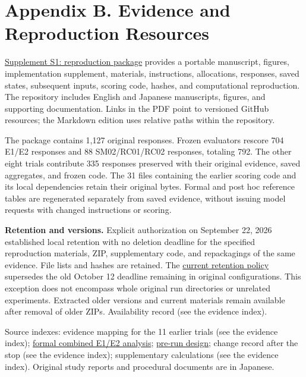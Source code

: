 \documentclass[10pt,a4paper]{article}
\begin{document}
\section{Appendix B. Evidence and Reproduction Resources}\label{paper-01-appendix-b.-evidence-and-reproduction-resources}

\href{https://github.com/metaSATOKEN/MRSI/blob/9443de315d283874df0c27e0e99b8c04f400709d/evidence/paper-01/README.md}{Supplement S1: reproduction package} provides a portable manuscript, figures, implementation supplement, materials, instructions, allocations, responses, saved states, subsequent inputs, scoring code, hashes, and computational reproduction. The repository includes English and Japanese manuscripts, figures, and supporting documentation. Links in the PDF point to versioned GitHub resources; the Markdown edition uses relative paths within the repository.

The package contains 1,127 original responses. Frozen evaluators rescore 704 E1/E2 responses and 88 SM02/RC01/RC02 responses, totaling 792. The other eight trials contribute 335 responses preserved with their original evidence, saved aggregates, and frozen code. The 31 files containing the earlier scoring code and its local dependencies retain their original bytes. Formal and post hoc reference tables are regenerated separately from saved evidence, without issuing model requests with changed instructions or scoring.

\textbf{Retention and versions.} Explicit authorization on September 22, 2026 established local retention with no deletion deadline for the specified reproduction materials, ZIP, supplementary code, and repackagings of the same evidence. File lists and hashes are retained. The \href{https://github.com/metaSATOKEN/MRSI/blob/9443de315d283874df0c27e0e99b8c04f400709d/evidence/paper-01/references/papers/paper-01/retention-policy-v0.1-2026-09-22.md}{current retention policy} supersedes the old October 12 deadline remaining in original configurations. This exception does not encompass whole original run directories or unrelated experiments. Extracted older versions and current materials remain available after removal of older ZIPs. Availability record (see the evidence index).

Source indexes: evidence mapping for the 11 earlier trials (see the evidence index); \href{https://github.com/metaSATOKEN/MRSI/blob/9443de315d283874df0c27e0e99b8c04f400709d/supplements/paper-01-pair-resume1-20260921/combined-analysis.json}{formal combined E1/E2 analysis}; \href{https://github.com/metaSATOKEN/MRSI/blob/9443de315d283874df0c27e0e99b8c04f400709d/docs/study2/paper-01-pair-plan-v0.1-2026-09-21.md}{pre-run design}; change record after the stop (see the evidence index); supplementary calculations (see the evidence index). Original study reports and procedural documents are in Japanese.
\end{document}

